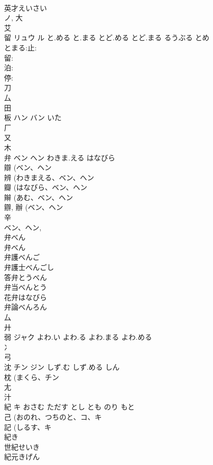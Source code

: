 \documentclass[8pt]{extreport}
\begin{document}
\begin{CJK}{UTF8}{min}
\\	英才えいさい 
\\	ノ, 大 
\\	艾 
\\	留	リュウ ル	と.める と.まる とど.める とど.まる るうぶる とめ	
\\	とまる:止: 
\\	留: 
\\	泊: 
\\	停: 
\\	刀 
\\	厶 
\\	田 
\\	板	ハン バン	いた	
\\	厂 
\\	又 
\\	木 
\\	弁	ベン ヘン	わきま.える はなびら	
\\	辯 (ベン、ヘン 
\\	辨 (わきまえる、ベン、ヘン 
\\	瓣 (はなびら、ベン、ヘン 
\\	辮 (あむ、ベン、ヘン 
\\	辧, 辦 (ベン、ヘン 
\\	辛 
\\	ベン、ヘン, 
\\	弁べん 
\\	弁べん 
\\	弁護べんご 
\\	弁護士べんごし 
\\	答弁とうべん 
\\	弁当べんとう 
\\	花弁はなびら 
\\	弁論べんろん 
\\	厶 
\\	廾 
\\	弱	ジャク	よわ.い よわ.る よわ.まる よわ.める	
\\	冫 
\\	弓 
\\	沈	チン ジン	しず.む しず.める しん	
\\	枕 (まくら、チン 
\\	尢 
\\	汁 
\\	紀	キ	おさむ ただす とし とも のり もと	
\\	己 (おのれ、つちのと、コ、キ 
\\	記 (しるす、キ 
\\	紀き
\\	世紀せいき
\\	紀元きげん

\end{CJK}
\end{document}
